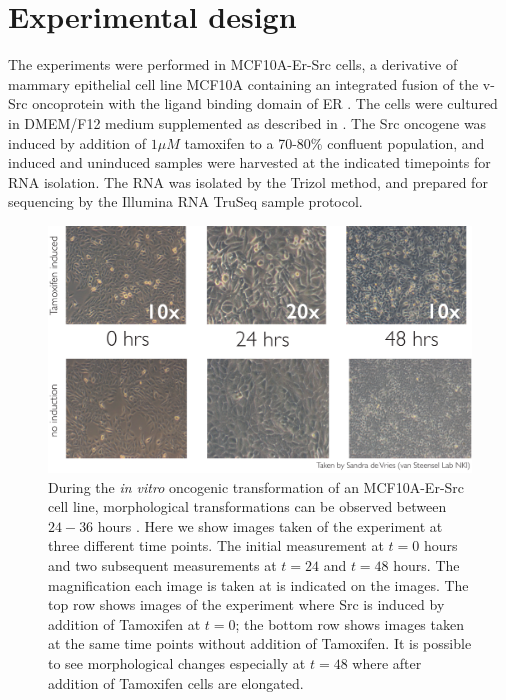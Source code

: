 \section{Experimental design}
\label{sec:experimental-design}

The experiments were performed in MCF10A-Er-Src cells, a derivative of mammary epithelial cell line MCF10A containing an integrated fusion of the v-Src oncoprotein with the ligand binding domain of ER \citep{Hirsch:2010ec,Iliopoulos:2009do}. The cells were cultured in DMEM/F12 medium supplemented as described in \cite{Debnath:2003km}. The Src oncogene was induced by addition of $1 \mu M$ tamoxifen to a 70-80\% confluent population, and induced and uninduced samples were harvested at the indicated timepoints for RNA isolation. The RNA was isolated by the Trizol method, and prepared for sequencing by the Illumina RNA TruSeq sample protocol.

\begin{figure}
  \centering
  \includegraphics[width=1\textwidth]{pics/mcf10a-experiment}
  \caption{During the {\it in vitro} oncogenic transformation of an MCF10A-Er-Src cell line, morphological transformations can be observed between $24-36$ hours \citep{Hirsch:2010ec}. Here we show images taken of the experiment at three different time points. The initial measurement at $t=0$ hours and two subsequent measurements at $t=24$ and $t=48$ hours. The magnification each image is taken at is indicated on the images. The top row shows images of the experiment where Src is induced by addition of Tamoxifen at $t=0$; the bottom row shows images taken at the same time points without addition of Tamoxifen. It is possible to see morphological changes especially at $t=48$ where after addition of Tamoxifen cells are elongated.}
  \label{fig:exp-pics}
\end{figure}

